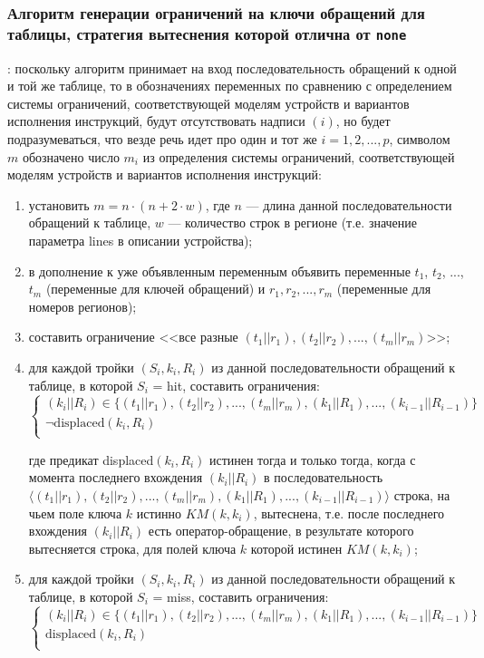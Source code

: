 \subsubsection*{Алгоритм генерации ограничений на ключи обращений для таблицы,
стратегия вытеснения которой отлична от \texttt{none}}:
поскольку алгоритм принимает на вход последовательность обращений к одной и той же таблице, то в обозначениях переменных по сравнению с определением системы ограничений, соответствующей моделям устройств и вариантов исполнения инструкций, будут отсутствовать надписи $(i)$, но будет подразумеваться, что везде речь идет про один и тот же $i = 1, 2, ..., p$, символом $m$ обозначено число $m_i$ из определения системы ограничений, соответствующей моделям устройств и вариантов исполнения инструкций: %

\begin{enumerate}
    \item установить $m = n \cdot (n + 2\cdot w)$, где $n$ --- длина данной последовательности обращений к таблице, $w$ --- количество строк в регионе (т.е. значение параметра lines в описании устройства);
    \item в дополнение к уже объявленным переменным объявить переменные $t_1$, $t_2$, ..., $t_m$ (переменные для ключей обращений) и $r_1, r_2, ..., r_m$ (переменные для номеров регионов);
    \item составить ограничение <<все разные $(t_1||r_1), (t_2||r_2), ..., (t_m||r_m)$>>;
    \item для каждой тройки $(S_i, k_i, R_i)$ из данной последовательности обращений к таблице, в которой $S_i$ = hit, составить ограничения:
$$\left\{\begin{array}{l}
    (k_i||R_i) \in \{(t_1||r_1), (t_2||r_2), ..., (t_m||r_m), (k_1||R_1), ..., (k_{i-1}||R_{i-1}) \}\\
    \neg \mbox{displaced}(k_i, R_i)\\
\end{array}\right.$$

где предикат displaced$(k_i, R_i)$ истинен тогда и только тогда, когда с момента последнего вхождения $(k_i||R_i)$ в последовательность $\langle (t_1||r_1), (t_2||r_2), ..., (t_m||r_m), (k_1||R_1), ..., (k_{i-1}||R_{i-1})\rangle$ строка, на чьем поле ключа $k$ истинно $KM(k, k_i)$, вытеснена, т.е. после последнего вхождения $(k_i||R_i)$ есть оператор-обращение, в результате которого вытесняется строка, для полей ключа $k$ которой истинен $KM(k, k_i)$;

    \item для каждой тройки $(S_i, k_i, R_i)$ из данной последовательности обращений к таблице, в которой $S_i$ = miss, составить ограничения:
$$\left\{\begin{array}{l}
    (k_i||R_i) \in \{(t_1||r_1), (t_2||r_2), ..., (t_m||r_m), (k_1||R_1), ...,
(k_{i-1}||R_{i-1}) \}\\
    \mbox{displaced}(k_i, R_i)\\
\end{array}\right.$$


\end{enumerate}
